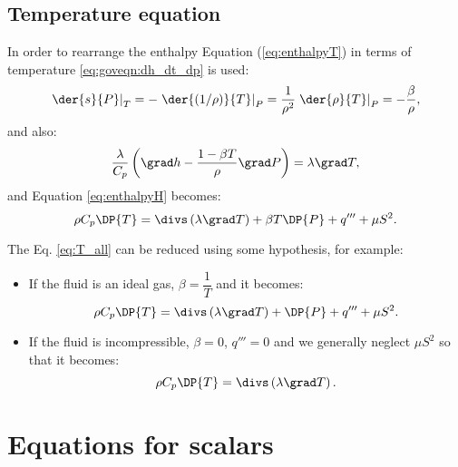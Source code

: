 \subsection{Temperature equation}

In order to rearrange the enthalpy Equation (\ref{eq:enthalpyT}) in terms of temperature \eqref{eq:goveqn:dh_dt_dp} is used:
\begin{equation}
 \left.\der{s}{P}\right|_T = -  \left.\der{(1/\rho)}{T}\right|_P = \frac{1}{\rho^2} \left.\der{\rho}{T}\right|_P=-\frac{\beta}{\rho},
\end{equation}
and also:
%
\begin{equation}
\dfrac{\lambda}{C_p} \left(\grad h -\dfrac{1-\beta T }{\rho}\grad P\right) = \lambda \grad T,
\end{equation}
%
 and Equation \eqref{eq:enthalpyH} becomes:
\begin{equation}
  \rho C_p \DP{T}=  \divs \left( \lambda \grad T \right) + \beta T \DP{P} +q''' + \mu S^2.
\label{eq:T_all}
\end{equation}

The Eq. \eqref{eq:T_all} can be reduced using some hypothesis, for example:
\begin{itemize}
 \item If the fluid is an ideal gas, $\beta=\dfrac{1}{T}$ and it becomes:
\begin{equation}
  \rho C_p \DP{T}=  \divs \left( \lambda \grad T \right) + \DP{P} +q''' + \mu S^2.
\end{equation}

 \item If the fluid is incompressible, $\beta=0$, $q'''=0 $ and we generally neglect $\mu S^2$  so that it becomes:
\begin{equation}
  \rho C_p \DP{T}=  \divs \left( \lambda \grad T \right).
\end{equation}
\end{itemize}

\section{Equations for scalars}

